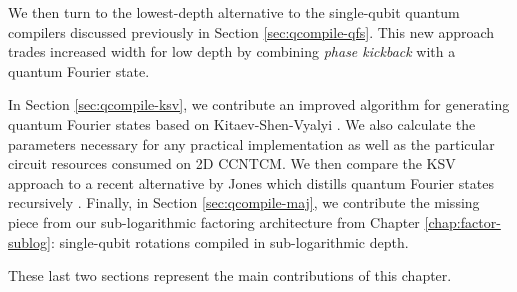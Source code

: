 We then turn to the lowest-depth alternative to
the single-qubit quantum compilers discussed previously
in Section \ref{sec:qcompile-qfs}. This new approach
trades increased width for low depth by combining \emph{phase kickback}
with a quantum Fourier state.

In Section \ref{sec:qcompile-ksv}, we contribute an improved
algorithm for generating quantum Fourier states based on
Kitaev-Shen-Vyalyi \cite{Kitaev2002}. We also calculate the
parameters necessary for any practical implementation as well as
the particular circuit resources consumed on \textsf{2D CCNTCM}.
We then compare the KSV approach to a recent alternative
by Jones which distills quantum Fourier states recursively \cite{Jones2013}.
Finally, in Section \ref{sec:qcompile-maj}, we contribute the
missing piece from our sub-logarithmic factoring architecture
from Chapter \ref{chap:factor-sublog}: single-qubit rotations
compiled in sub-logarithmic depth.

These last two sections represent the main contributions of this chapter.
















